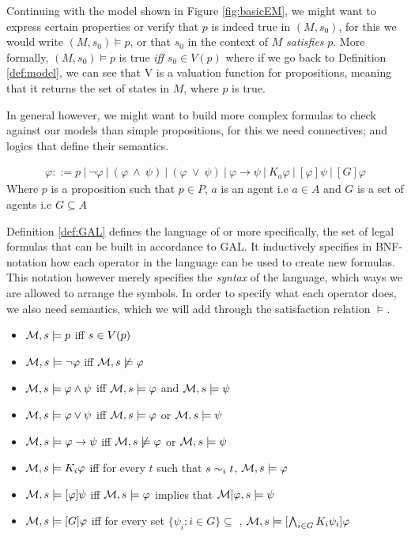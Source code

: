 Continuing with the model shown in Figure \ref{fig:basicEM}, we might want to express certain properties or verify that $p$ is indeed true in $(M,s_0)$, for this we would write $(M,s_0) \models p$, or that $s_0$ in the context of $M$ \textit{satisfies} $p$. More formally, $(M,s_0) \models p$ is true \textit{iff} $s_0 \in V(p)$ where if we go back to Definition \ref{def:model}, we can see that V is a valuation function for propositions, meaning that it returns the set of states in $M$, where $p$ is true. 

In general however, we might want to build more complex formulas to check against our models than simple propositions, for this we need connectives; and logics that define their semantics.

\begin{definition} \hfill
	\label{def:GAL}
 	\begin{align*}
		\varphi ::= p \ | ~\neg\varphi ~|~ (\varphi~\wedge~\psi) ~|~ (\varphi~\vee~\psi) ~|~ \varphi 							\rightarrow \psi ~|~ K_a\varphi ~|~ [\varphi]\psi  ~|~ [G]\varphi
	\end{align*}
	Where $p$ is a proposition such that $p \in P$, $a$ is an agent i.e $a \in A$ and $G$ is a set of agents i.e $G \subseteq A$
\end{definition}

Definition \ref{def:GAL} defines the language of  or more specifically, the set of legal formulas that can be built in accordance to GAL. It inductively specifies in BNF-notation how each operator in the language can be used to create new formulas. This notation however merely specifies the \textit{syntax} of the language, which ways we are allowed to arrange the symbols. In order to specify what each operator does, we also need semantics, which we will add through the satisfaction relation $\models$.

\begin{definition} \hfill
	\label{def:GALsem}
	\begin{itemize}
		\item[] $\mathcal{M},s \models p $ iff $ s \in V(p)$
		\item[] $\mathcal{M},s \models \neg\varphi$ iff $ \mathcal{M},s \not\models \varphi$
		\item[] $\mathcal{M},s \models \varphi \wedge \psi $ iff $ \mathcal{M},s \models \varphi $ and $ \mathcal{M},s \models \psi$
		\item[] $\mathcal{M},s \models \varphi \vee \psi $ iff $ \mathcal{M},s \models \varphi $ or $ \mathcal{M},s \models \psi$
		\item[] $\mathcal{M},s \models \varphi \rightarrow \psi $ iff $ \mathcal{M},s \not\models \varphi $ or $ \mathcal{M},s \models \psi$
		\item[] $\mathcal{M},s \models K_i\varphi $ iff for every $t$ such that $s\sim_{i}t$, $\mathcal{M},s \models \varphi$
		\item[] $\mathcal{M},s \models [\varphi]\psi $ iff $ \mathcal{M},s \models \varphi $ implies that $ \mathcal{M}|\varphi,s \models \psi$
		\item[] $\mathcal{M},s \models [G]\varphi $ iff for every set $\{\psi_i: i \in G\} \subseteq $ , $ \mathcal{M},s \models [\bigwedge_{i\in G}K_i\psi_i]\varphi$ 
	\end{itemize}
\end{definition}

